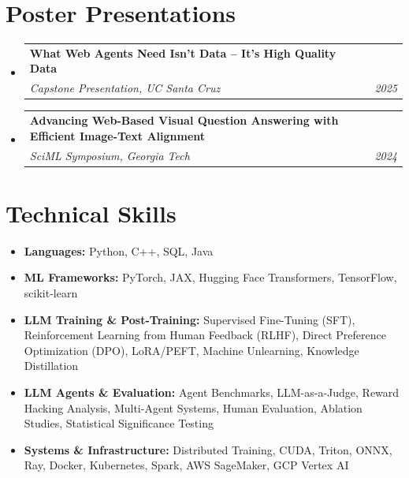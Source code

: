 \documentclass[letterpaper,11pt]{article}
\makeatletter
\newcommand{\resumeSubheading}[4]{
  \vspace{-2pt}\item
    \begin{tabular*}{0.97\textwidth}[t]{l@{\extracolsep{\fill}}r}
      \textbf{#1} & #2 \\
      \textit{\small #3} & \textit{\small #4} \\
    \end{tabular*}\vspace{-10pt}
}
\newcommand{\resumeSubHeadingListStart}{\begin{itemize}[leftmargin=0.15in, label={}]}
\newcommand{\resumeSubHeadingListEnd}{\end{itemize}}
\makeatother
\begin{document}
\section{Poster Presentations}
\resumeSubHeadingListStart
    \resumeSubheading
    {What Web Agents Need Isn't Data -- It's High Quality Data}{}
    {Capstone Presentation, UC Santa Cruz}{2025}
    \resumeSubheading
    {Advancing Web-Based Visual Question Answering with Efficient Image-Text Alignment}{}
    {SciML Symposium, Georgia Tech}{2024}
\resumeSubHeadingListEnd

\section{Technical Skills}
\begin{itemize}[leftmargin=0.2in, itemsep=-1mm]
  \small
  \item \textbf{Languages:} Python, C++, SQL, Java

  \item \textbf{ML Frameworks:} PyTorch, JAX, Hugging Face Transformers, TensorFlow, scikit-learn

  \item \textbf{LLM Training \& Post-Training:} Supervised Fine-Tuning (SFT), Reinforcement Learning from Human Feedback (RLHF), Direct Preference Optimization (DPO), LoRA/PEFT, Machine Unlearning, Knowledge Distillation

  \item \textbf{LLM Agents \& Evaluation:} Agent Benchmarks, LLM-as-a-Judge, Reward Hacking Analysis, Multi-Agent Systems, Human Evaluation, Ablation Studies, Statistical Significance Testing

  \item \textbf{Systems \& Infrastructure:} Distributed Training, CUDA, Triton, ONNX, Ray, Docker, Kubernetes, Spark, AWS SageMaker, GCP Vertex AI
\end{itemize}
\end{document}
